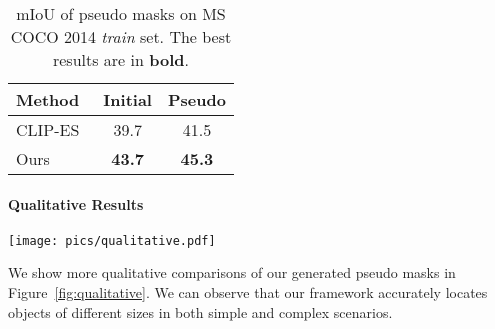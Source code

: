 \documentclass[letterpaper]{article} \usepackage[submission]{aaai24}  \usepackage{times}  \usepackage{helvet}  \usepackage{courier}  \usepackage[hyphens]{url}  \usepackage{graphicx} \urlstyle{rm} \def\UrlFont{\rm}  \usepackage{natbib}  \usepackage{caption} \frenchspacing  \setlength{\pdfpagewidth}{8.5in} \setlength{\pdfpageheight}{11in} \usepackage{algorithm}
\begin{document}
\begin{table}
  \centering
  \begin{tabular}{lcc}
    \toprule
    Method  & Initial   &  Pseudo\\
    \midrule
    CLIP-ES~\cite{CLIP-ES} & 39.7   &  41.5 \\
Ours    & \textbf{43.7}   &  \textbf{45.3}  \\
    \bottomrule
  \end{tabular}
  \caption{mIoU of pseudo masks on MS COCO 2014 \emph{train} set. The best results are in \textbf{bold}.}
  \label{tab:COCO_train}
\end{table}

\paragraph{Qualitative Results}

\begin{figure*}
  \centering
  \texttt{[image: pics/qualitative.pdf]}
  \caption{
  More visualization results on PASCAL VOC 2012 and MS COCO 2014 datasets.
}
  \label{fig:qualitative}
\end{figure*}
We show more qualitative comparisons of our generated pseudo masks in Figure~\ref{fig:qualitative}.
We can observe that our framework accurately locates objects of different sizes in both simple and complex scenarios.
\end{document}

